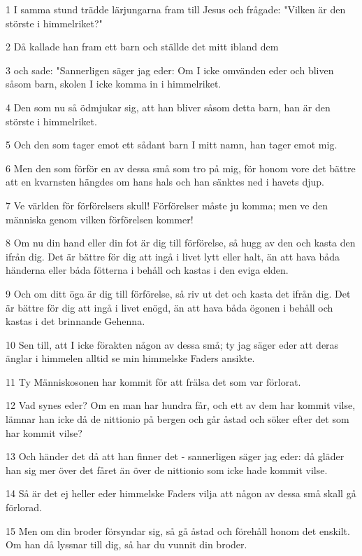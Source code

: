 \par 1 I samma stund trädde lärjungarna fram till Jesus och frågade: "Vilken är den störste i himmelriket?"
\par 2 Då kallade han fram ett barn och ställde det mitt ibland dem
\par 3 och sade: "Sannerligen säger jag eder: Om I icke omvänden eder och bliven såsom barn, skolen I icke komma in i himmelriket.
\par 4 Den som nu så ödmjukar sig, att han bliver såsom detta barn, han är den störste i himmelriket.
\par 5 Och den som tager emot ett sådant barn I mitt namn, han tager emot mig.
\par 6 Men den som förför en av dessa små som tro på mig, för honom vore det bättre att en kvarnsten hängdes om hans hals och han sänktes ned i havets djup.
\par 7 Ve världen för förförelsers skull! Förförelser måste ju komma; men ve den människa genom vilken förförelsen kommer!
\par 8 Om nu din hand eller din fot är dig till förförelse, så hugg av den och kasta den ifrån dig. Det är bättre för dig att ingå i livet lytt eller halt, än att hava båda händerna eller båda fötterna i behåll och kastas i den eviga elden.
\par 9 Och om ditt öga är dig till förförelse, så riv ut det och kasta det ifrån dig. Det är bättre för dig att ingå i livet enögd, än att hava båda ögonen i behåll och kastas i det brinnande Gehenna.
\par 10 Sen till, att I icke förakten någon av dessa små; ty jag säger eder att deras änglar i himmelen alltid se min himmelske Faders ansikte.
\par 11 Ty Människosonen har kommit för att frälsa det som var förlorat.
\par 12 Vad synes eder? Om en man har hundra får, och ett av dem har kommit vilse, lämnar han icke då de nittionio på bergen och går åstad och söker efter det som har kommit vilse?
\par 13 Och händer det då att han finner det - sannerligen säger jag eder: då gläder han sig mer över det fåret än över de nittionio som icke hade kommit vilse.
\par 14 Så är det ej heller eder himmelske Faders vilja att någon av dessa små skall gå förlorad.
\par 15 Men om din broder försyndar sig, så gå åstad och förehåll honom det enskilt. Om han då lyssnar till dig, så har du vunnit din broder.
